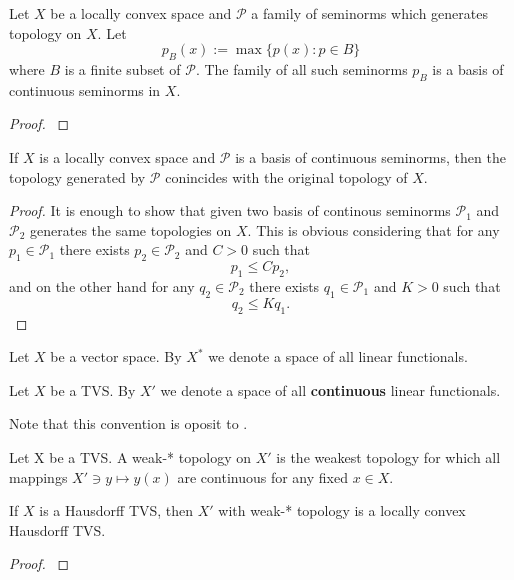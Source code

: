 \documentclass[main.tex]{subfiles}
\begin{document}
\begin{theorem}
Let $X$ be a locally convex space and $\mathcal{P}$ a family of seminorms which generates topology on $X$. Let
\begin{equation}
p_B(x) := \max\{p(x):p\in B\}
\end{equation}
where $B$ is a finite subset of $\mathcal{P}$.
The family of all such seminorms $p_B$ is a basis of continuous seminorms in $X$. 
\end{theorem}
\begin{proof}
\cite[See][Locally convex spaces. Seminorms.]{treves1970}
\end{proof}

\begin{theorem}
If $X$ is a locally convex space and $\mathcal{P}$ is a basis of continuous seminorms, then the topology generated by $\mathcal{P}$ conincides with the original topology of $X$.
\end{theorem}
\begin{proof}
It is enough to show that given two basis of continous seminorms $\mathcal{P}_1$ and $\mathcal{P}_2$ generates the same topologies on $X$. This is obvious considering that for any $p_1\in \mathcal{P}_1$ there exists $p_2\in \mathcal{P}_2$ and $C > 0$ such that 
\begin{equation}
p_1 \leq C p_2,
\end{equation}
and on the other hand for any $q_2\in \mathcal{P}_2$ there exists $q_1\in\mathcal{P}_1$ and $K > 0$ such that
\begin{equation}
q_2 \leq K q_1.
\end{equation}
\end{proof}

\begin{definition}
Let $X$ be a vector space. By $X^*$ we denote a space of all linear functionals.
\end{definition}

\begin{definition}
Let $X$ be a TVS. By $X'$ we denote a space of all \textbf{continuous} linear functionals.
\end{definition}

Note that this convention is oposit to \cite{rudin1991}.
\begin{definition}
Let X be a TVS. A weak-* topology on $X'$ is the weakest topology for which all mappings $X'\ni y\mapsto y(x)$ are continuous for any fixed $x\in X$. 
\end{definition}
\begin{theorem}
\label{weak-star-locally-convex}
If $X$ is a Hausdorff TVS, then $X'$ with weak-* topology is a locally convex Hausdorff TVS.
\end{theorem}
\begin{proof}
\cite[See][3.14]{rudin1991}
\end{proof}
\end{document}
